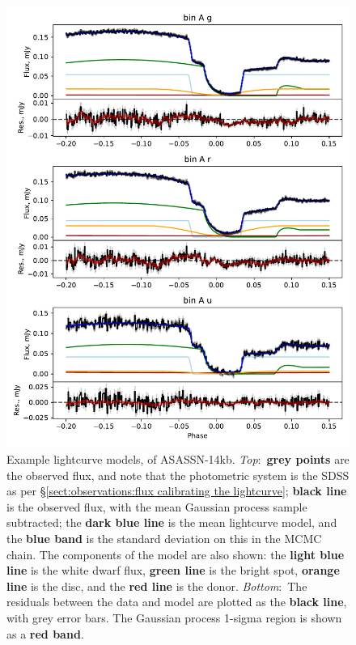 \begin{figure}
    \centering
    \includegraphics[width=\textwidth]{figures/results/ASASSN-14kb/ASASSN-14kb_ex_1.pdf}
    \caption{Example lightcurve models, of ASASSN-14kb. {\it Top}:~{\bf grey points} are the observed flux, and note that the photometric system is the SDSS as per \S\ref{sect:observations:flux calibrating the lightcurve}; {\bf black line} is the observed flux, with the mean Gaussian process sample subtracted; the {\bf dark blue line} is the mean lightcurve model, and the {\bf blue band} is the standard deviation on this in the MCMC chain. The components of the model are also shown: the {\bf light blue line} is the white dwarf flux, {\bf green line} is the bright spot, {\bf orange line} is the disc, and the {\bf red line} is the donor. {\it Bottom}:~The residuals between the data and model are plotted as the {\bf black line}, with grey error bars. The Gaussian process 1-sigma region is shown as a {\bf red band}.}
    \label{fig:results:12 new CVs:ASASSN-14kb all lightcurves}
\end{figure}
